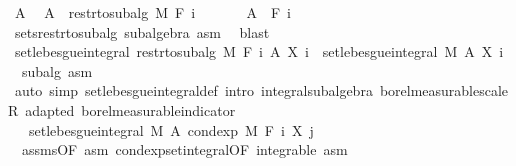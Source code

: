 \begin{isabellebody}
\ A\ \isamarkupfalse%
\ {\isachardoublequoteopen}A\ {\isasymin}\ restr{\isacharunderscore}{\kern0pt}to{\isacharunderscore}{\kern0pt}subalg\ M\ {\isacharparenleft}{\kern0pt}F\ i{\isacharparenright}{\kern0pt}{\isachardoublequoteclose}\isanewline
\ \ \ \ \isamarkupfalse%
\ {\isacharasterisk}{\kern0pt}{\isacharcolon}{\kern0pt}\ {\isachardoublequoteopen}A\ {\isasymin}\ F\ i{\isachardoublequoteclose}\ \isamarkupfalse%
\ sets{\isacharunderscore}{\kern0pt}restr{\isacharunderscore}{\kern0pt}to{\isacharunderscore}{\kern0pt}subalg\ subalgebra\ asm\ \isamarkupfalse%
\ blast\ \isanewline
\ \ \ \ \isamarkupfalse%
\ {\isachardoublequoteopen}set{\isacharunderscore}{\kern0pt}lebesgue{\isacharunderscore}{\kern0pt}integral\ {\isacharparenleft}{\kern0pt}restr{\isacharunderscore}{\kern0pt}to{\isacharunderscore}{\kern0pt}subalg\ M\ {\isacharparenleft}{\kern0pt}F\ i{\isacharparenright}{\kern0pt}{\isacharparenright}{\kern0pt}\ A\ {\isacharparenleft}{\kern0pt}X\ i{\isacharparenright}{\kern0pt}\ {\isacharequal}{\kern0pt}\ set{\isacharunderscore}{\kern0pt}lebesgue{\isacharunderscore}{\kern0pt}integral\ M\ A\ {\isacharparenleft}{\kern0pt}X\ i{\isacharparenright}{\kern0pt}{\isachardoublequoteclose}\ \isamarkupfalse%
\ {\isacharasterisk}{\kern0pt}\ subalg\ asm\ \isamarkupfalse%
\ {\isacharparenleft}{\kern0pt}auto\ simp{\isacharcolon}{\kern0pt}\ set{\isacharunderscore}{\kern0pt}lebesgue{\isacharunderscore}{\kern0pt}integral{\isacharunderscore}{\kern0pt}def\ intro{\isacharcolon}{\kern0pt}\ integral{\isacharunderscore}{\kern0pt}subalgebra{}\ borel{\isacharunderscore}{\kern0pt}measurable{\isacharunderscore}{\kern0pt}scaleR\ adapted\ borel{\isacharunderscore}{\kern0pt}measurable{\isacharunderscore}{\kern0pt}indicator{\isacharparenright}{\kern0pt}\ \isanewline
\ \ \ \ \isamarkupfalse%
\ \isamarkupfalse%
\ {\isachardoublequoteopen}{\isachardot}{\kern0pt}{\isachardot}{\kern0pt}{\isachardot}{\kern0pt}\ {\isacharequal}{\kern0pt}\ set{\isacharunderscore}{\kern0pt}lebesgue{\isacharunderscore}{\kern0pt}integral\ M\ A\ {\isacharparenleft}{\kern0pt}cond{\isacharunderscore}{\kern0pt}exp\ M\ {\isacharparenleft}{\kern0pt}F\ i{\isacharparenright}{\kern0pt}\ {\isacharparenleft}{\kern0pt}X\ j{\isacharparenright}{\kern0pt}{\isacharparenright}{\kern0pt}{\isachardoublequoteclose}\ \isamarkupfalse%
\ {\isacharasterisk}{\kern0pt}\ assms{\isacharparenleft}{\kern0pt}{}{\isacharparenright}{\kern0pt}{\isacharbrackleft}{\kern0pt}OF\ asm{\isacharbrackright}{\kern0pt}\ cond{\isacharunderscore}{\kern0pt}exp{\isacharunderscore}{\kern0pt}set{\isacharunderscore}{\kern0pt}integral{\isacharbrackleft}{\kern0pt}OF\ integrable{\isacharbrackright}{\kern0pt}\ asm\ \isamarkupfalse%

\end{isabellebody}

